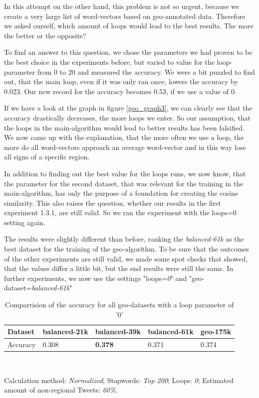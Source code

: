 \documentclass[../Main.tex]{subfiles}
\begin{document}
In this attempt on the other hand, this problem is not so urgent, because we create a very large list of word-vectors based on geo-annotated data. Therefore we asked ourself, which amount of loops would lead to the best results. The more the better or the opposite? 

To find an answer to this question, we chose the parameters we had proven to be the best choice in the experiments before, but varied to value for the loop-parameter from 0 to 20 and measured the accuracy. 
We were a bit puzzled to find out, that the main loop, even if it was only ran once, lowers the accuracy by 0.023. Our new record for the accuracy becomes 0.53, if we use a value of 0. 

If we have a look at the graph in figure \ref{geo_graph3}, we can clearly see that the accuracy drastically decreases, the more loops we enter. So our assumption, that the loops in the main-algorithm would lead to better results has been falsified. We now came up with the explanation, that the more often we use a loop, the more do all word-vectors approach an average word-vector and in this way lose all signs of a specific region.

In addition to finding out the best value for the loops runs, we now know, that the parameter for the second dataset, that was relevant for the training in the main-algorithm, has only the purpose of a foundation for creating the cosine similarity. This also raises the question, whether our results in the first experiment 1.3.1, are still valid. So we ran the experiment with the loops=0 setting again.

The results were slightly different than before, ranking the \emph{balanced-61k} as the best dataset for the training of the geo-algorithm. To be sure that the outcomes of the other experiments are still valid, we made some spot checks that showed, that the values differ a little bit, but the end results were still the same. In further experiments, we now use the settings "loops=\emph{0}" and "geo-dataset=\emph{balanced-61k}"
\begin{table}
\begin{center}
    \begin{tabular}{|l|llll|}
    \hline
    Dataset     & balanced-21k & balanced-39k & balanced-61k & geo-175k \\ \hline
    Accuracy    & 0.308      & \textbf{0.378}        &0.371       & 0.374               \\ \hline
    \end{tabular} \\
\end{center}
  Calculation method: \textit{Normalized}; Stopwords: \textit{Top 200}; Loops: \textit{0}; Estimated amount of non-regional Tweets: \textit{60\%}.
  \caption{Comparrision of the accuracy for all geo-datasets with a loop parameter of '0'}
  \label{geo_datasets}
\end{table}
\end{document}
